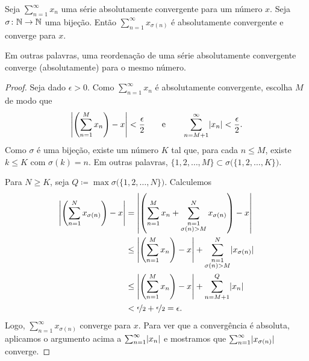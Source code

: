 \begin{prop}
Seja $\sum_{n=1}^\infty x_n$ uma série absolutamente convergente para um número
$x$. Seja $\sigma \colon {\mathbb{N}} \to {\mathbb{N}}$ uma bijeção. Então
$\sum_{n=1}^\infty x_{\sigma(n)}$ é absolutamente convergente e converge para $x$.
\end{prop}

Em outras palavras, uma reordenação de uma série absolutamente convergente
converge (absolutamente) para o mesmo número.

\begin{proof}
Seja dado $\epsilon > 0$. Como $\sum_{n=1}^\infty x_n$ é absolutamente convergente,
escolha $M$ de modo que
\begin{equation*}
\left\lvert {\left(\sum_{n=1}^M x_n \right) - x} \right\rvert < \frac{\epsilon}{2}
\qquad \text{e} \qquad
\sum_{n=M+1}^\infty \lvert {x_n} \rvert < \frac{\epsilon}{2} .
\end{equation*}
Como $\sigma$ é uma bijeção, existe um número $K$ tal que, para cada
$n \leq M$, existe $k \leq K$ com $\sigma(k) = n$.
Em outras palavras,
$\{ 1,2,\ldots,M \} \subset \sigma\bigl(\{ 1,2,\ldots,K \} \bigr)$.

Para $N \geq K$, seja $Q \coloneqq \max \sigma\bigl(\{ 1,2,\ldots,N \}\bigr)$.
Calculemos
\begin{equation*}
\begin{split}
\left\lvert {\left( \sum_{n=1}^N x_{\sigma(n)} \right) - x} \right\rvert
& =
\left\lvert { \left( \sum_{n=1}^M x_n
+
\sum_{\substack{n=1\\\sigma(n) > M}}^N x_{\sigma(n)} \right) - x} \right\rvert
\\
& \leq
\left\lvert { \left( \sum_{n=1}^M x_n \right) - x} \right\rvert
+
\sum_{\substack{n=1\\\sigma(n) > M}}^N \lvert {x_{\sigma(n)}} \rvert
\\
& \leq
\left\lvert { \left( \sum_{n=1}^M x_n \right) - x} \right\rvert
+
\sum_{n=M+1}^Q \lvert {x_{n}} \rvert
\\
& < \nicefrac{\epsilon}{2} + \nicefrac{\epsilon}{2} = \epsilon .
\end{split}
\end{equation*}
Logo, $\sum_{n=1}^\infty x_{\sigma(n)}$ converge para $x$. Para ver que a convergência
é absoluta, aplicamos o argumento acima a $\sum_{n=1}^\infty \lvert {x_n} \rvert$ e mostramos
que $\sum_{n=1}^\infty \lvert {x_{\sigma(n)}} \rvert$ converge.
\end{proof}

